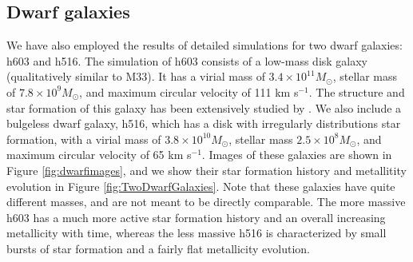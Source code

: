 \documentclass[nofootinbib,twocolumn,prd]{emulateapj}
\newcommand\msun{M_\odot}
\newcommand\DwarfOne{h603}
\newcommand\DwarfTwo{h516}
\begin{document}
\subsection{Dwarf galaxies}

We have also employed the results of detailed simulations for two dwarf galaxies: \DwarfOne{} and \DwarfTwo{}.  The simulation of h603 consists of a low-mass disk galaxy (qualitatively similar to M33).  It has a virial mass of $3.4 \times 10^{11} \msun$, stellar mass of $7.8 \times 10^9 \msun$, and maximum circular velocity of 111 km s$^{-1}$.  The structure and star formation of this galaxy has been extensively studied by \citet{Christensen14b}.  We also include a bulgeless dwarf galaxy, h516, which has a disk with irregularly distributions star formation, with a virial mass of $3.8 \times 10^{10}\msun$, stellar mass $2.5 \times 10^8 \msun$, and maximum circular velocity of 65 km s$^{-1}$.  Images of these galaxies are shown in Figure \ref{fig:dwarfimages}, and we show their star formation history and metallitity evolution in  Figure \ref{fig:TwoDwarfGalaxies}.  Note that these galaxies have quite different masses, and are not meant to be directly comparable.  The more massive h603 has a much more active star formation history and an overall increasing metallicity with time, whereas the less massive h516 is characterized by small bursts of star formation and a fairly flat metallicity evolution.

\end{document}
